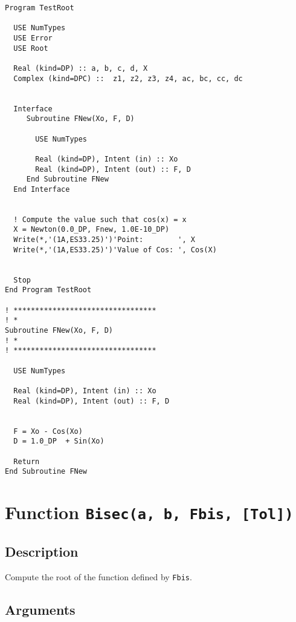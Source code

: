 \begin{verbatim}
Program TestRoot

  USE NumTypes
  USE Error
  USE Root

  Real (kind=DP) :: a, b, c, d, X
  Complex (kind=DPC) ::  z1, z2, z3, z4, ac, bc, cc, dc


  Interface
     Subroutine FNew(Xo, F, D)
       
       USE NumTypes
       
       Real (kind=DP), Intent (in) :: Xo
       Real (kind=DP), Intent (out) :: F, D
     End Subroutine FNew
  End Interface


  ! Compute the value such that cos(x) = x
  X = Newton(0.0_DP, Fnew, 1.0E-10_DP)
  Write(*,'(1A,ES33.25)')'Point:        ', X
  Write(*,'(1A,ES33.25)')'Value of Cos: ', Cos(X)


  Stop
End Program TestRoot

! *********************************
! *
Subroutine FNew(Xo, F, D)
! *
! *********************************  

  USE NumTypes
  
  Real (kind=DP), Intent (in) :: Xo
  Real (kind=DP), Intent (out) :: F, D

  
  F = Xo - Cos(Xo)
  D = 1.0_DP  + Sin(Xo)

  Return
End Subroutine FNew
\end{verbatim}


\section{Function \texttt{Bisec(a,  b,  Fbis,  [Tol])}}

\subsection{Description}

Compute the root of the function defined by \texttt{Fbis}. 

\subsection{Arguments}

